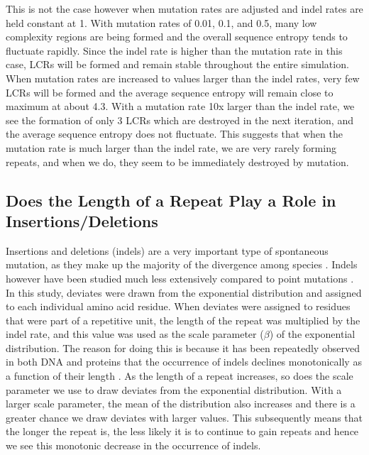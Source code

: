 \documentclass[10pt]{article}
\begin{document}
This is not the case however when mutation rates are adjusted and indel rates are held constant at 1. With mutation rates of 0.01, 0.1, and 0.5, many low complexity regions are being formed and the overall sequence entropy tends to fluctuate rapidly. Since the indel rate is higher than the mutation rate in this case, LCRs will be formed and remain stable throughout the entire simulation. When mutation rates are increased to values larger than the indel rates, very few LCRs will be formed and the average sequence entropy will remain close to maximum at about 4.3. With a mutation rate 10x larger than the indel rate, we see the formation of only 3 LCRs which are destroyed in the next iteration, and the average sequence entropy does not fluctuate. This suggests that when the mutation rate is much larger than the indel rate, we are very rarely forming repeats, and when we do, they seem to be immediately destroyed by mutation.


\subsection{Does the Length of a Repeat Play a Role in Insertions/Deletions}

Insertions and deletions (indels) are a very important type of spontaneous mutation, as they make up the majority of the divergence among species \citep{britten2002divergence, anzai2003comparative}. Indels however have been studied much less extensively compared to point mutations \citep{cartwright2009problems}. In this study, deviates were drawn from the exponential distribution and assigned to each individual amino acid residue. When deviates were assigned to residues that were part of a repetitive unit, the length of the repeat was multiplied by the indel rate, and this value was used as the scale parameter ($\beta$) of the exponential distribution. The reason for doing this is because it has been repeatedly observed in both DNA and proteins that the occurrence of indels declines monotonically as a function of their length \citep{pascarella1992analysis, benner1993empirical, qian2001distribution, loewenthal2021probabilistic}. As the length of a repeat increases, so does the scale parameter we use to draw deviates from the exponential distribution. With a larger scale parameter, the mean of the distribution also increases and there is a greater chance we draw deviates with larger values. This subsequently means that the longer the repeat is, the less likely it is to continue to gain repeats and hence we see this monotonic decrease in the occurrence of indels.
\end{document}
